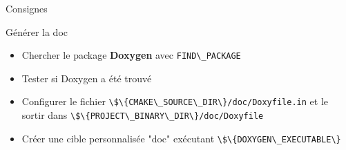 \documentclass{beamer}
\begin{document}
\begin{frame}{Consignes}
  \begin{exampleblock}{Générer la doc}
    \begin{itemize}
    \item Chercher le package \textbf{Doxygen} avec \verb?FIND\_PACKAGE ?
    \item Tester si Doxygen a été trouvé
    \item Configurer le fichier \verb?\$\{CMAKE\_SOURCE\_DIR\}/doc/Doxyfile.in? et le sortir dans \verb?\$\{PROJECT\_BINARY\_DIR\}/doc/Doxyfile?
    \item Créer une cible personnalisée "doc" exécutant \verb?\$\{DOXYGEN\_EXECUTABLE\}?
    \end{itemize}
  \end{exampleblock}
\end{frame}

\end{document}
